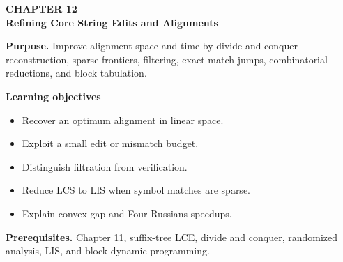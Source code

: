 \documentclass[11pt]{article}
\begin{document}
\begin{tcolorbox}[
  enhanced,breakable,colback=Primary!4,colframe=Primary,boxrule=0.9pt,
  arc=2mm,left=3mm,right=3mm,top=2.5mm,bottom=2.5mm]
{\sffamily\color{Accent}\bfseries CHAPTER 12}\\[-1pt]
{\sffamily\LARGE\bfseries\color{Primary} Refining Core String Edits and Alignments}

\vspace{2pt}
\textbf{Purpose.} Improve alignment space and time by divide-and-conquer reconstruction, sparse frontiers, filtering, exact-match jumps, combinatorial reductions, and block tabulation.

\textbf{Learning objectives}
\begin{itemize}
  \item Recover an optimum alignment in linear space.
  \item Exploit a small edit or mismatch budget.
  \item Distinguish filtration from verification.
  \item Reduce LCS to LIS when symbol matches are sparse.
  \item Explain convex-gap and Four-Russians speedups.
\end{itemize}

\textbf{Prerequisites.} Chapter 11, suffix-tree LCE, divide and conquer, randomized analysis, LIS, and block dynamic programming.
\end{tcolorbox}
\end{document}
